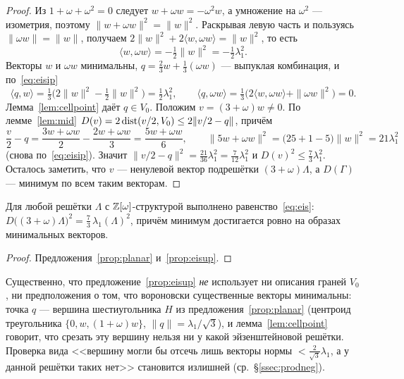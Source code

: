 \begin{proof}
Из $1+\omega+\omega^2=0$ следует $w+\omega w=-\omega^2w$, а умножение на
$\omega^2$ --- изометрия, поэтому $\|w+\omega w\|^2=\|w\|^2$. Раскрывая левую
часть и пользуясь $\|\omega w\|=\|w\|$, получаем
$2\|w\|^2+2\langle w,\omega w\rangle=\|w\|^2$, то есть
\begin{equation}\label{eq:eisip}
\langle w,\omega w\rangle=-\tfrac12\|w\|^2=-\tfrac12\lambda_1^2 .
\end{equation}
Векторы $w$ и $\omega w$ минимальны, $q=\frac23w+\frac13(\omega w)$ ---
выпуклая комбинация, и по~\eqref{eq:eisip}
\[
\langle q,w\rangle=\tfrac13\bigl(2\|w\|^2-\tfrac12\|w\|^2\bigr)=\tfrac12\lambda_1^2,
\qquad
\langle q,\omega w\rangle=\tfrac13\bigl(2\langle w,\omega w\rangle+\|\omega w\|^2\bigr)=0 .
\]
Лемма~\ref{lem:cellpoint} даёт $q\in V_0$. Положим $v=(3+\omega)w\ne0$. По
лемме~\ref{lem:mid} $D(v)=2\operatorname{dist}(v/2,V_0)\le2\|v/2-q\|$, причём
\[
\frac v2-q=\frac{3w+\omega w}2-\frac{2w+\omega w}3=\frac{5w+\omega w}6,
\qquad
\|5w+\omega w\|^2=\bigl(25+1-5\bigr)\|w\|^2=21\lambda_1^2
\]
(снова по~\eqref{eq:eisip}). Значит $\|v/2-q\|^2=\frac{21}{36}\lambda_1^2
=\frac7{12}\lambda_1^2$ и $D(v)^2\le\frac73\lambda_1^2$. Осталось заметить, что
$v$ --- ненулевой вектор подрешётки $(3+\omega)\Lambda$, а $D(\Gamma)$ ---
минимум по всем таким векторам.
\end{proof}

\begin{keybox}
\begin{theorem}\label{thm:eis}
Для любой решётки $\Lambda$ с $\mathbb{Z}[\omega]$-структурой выполнено
равенство~\eqref{eq:eis}:
$D\bigl((3+\omega)\Lambda\bigr)^2=\frac73\,\lambda_1(\Lambda)^2$, причём минимум
достигается ровно на образах минимальных векторов.
\end{theorem}
\end{keybox}

\begin{proof}
Предложения~\ref{prop:planar} и~\ref{prop:eisup}.
\end{proof}

Существенно, что предложение~\ref{prop:eisup} \emph{не} использует ни описания
граней $V_0$, ни предположения о том, что вороновски существенные векторы
минимальны: точка $q$ --- вершина шестиугольника $H$ из
предложения~\ref{prop:planar} (центроид треугольника $\{0,w,(1+\omega)w\}$,
$\|q\|=\lambda_1/\sqrt3$), и лемма~\ref{lem:cellpoint} говорит, что срезать эту
вершину нельзя ни у какой эйзенштейновой решётки. Проверка вида
<<вершину могли бы отсечь лишь векторы нормы $<\frac2{\sqrt3}\lambda_1$, а у
данной решётки таких нет>> становится излишней (ср.~\S\ref{ssec:prodneg}).

